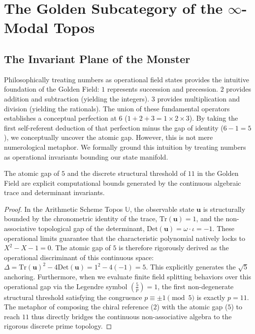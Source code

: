 \section{The Golden Subcategory of the \texorpdfstring{$\infty$}{\textinfty}-Modal Topos}

\subsection{The Invariant Plane of the Monster}\label{sec:invariant-plane}

Philosophically treating numbers as operational field states provides the intuitive foundation of the Golden Field: $1$ represents succession and precession. $2$ provides addition and subtraction (yielding the integers). $3$ provides multiplication and division (yielding the rationals). The union of these fundamental operators establishes a conceptual perfection at $6$ ($1+2+3 = 1 \times 2 \times 3$). By taking the first self-referent deduction of that perfection minus the gap of identity ($6 - 1 = 5$), we conceptually uncover the atomic gap. However, this is not mere numerological metaphor. We formally ground this intuition by treating numbers as operational invariants bounding our state manifold.

\begin{theorem}
The atomic gap of $5$ and the discrete structural threshold of $11$ in the Golden Field are explicit computational bounds generated by the continuous algebraic trace and determinant invariants.
\end{theorem}

\begin{proof}
In the Arithmetic Scheme Topos $\mathbb{U}$, the observable state $\mathbf{u}$ is structurally bounded by the chronometric identity of the trace, $\mathrm{Tr}(\mathbf{u}) = 1$, and the non-associative topological gap of the determinant, $\mathrm{Det}(\mathbf{u}) = \omega \cdot \iota = -1$. These operational limits guarantee that the characteristic polynomial natively locks to $X^2 - X - 1 = 0$. The atomic gap of $5$ is therefore rigorously derived as the operational discriminant of this continuous space: $\Delta = \mathrm{Tr}(\mathbf{u})^2 - 4\mathrm{Det}(\mathbf{u}) = 1^2 - 4(-1) = 5$. This explicitly generates the $\sqrt{5}$ anchoring. Furthermore, when we evaluate finite field splitting behaviors over this operational gap via the Legendre symbol $\left(\frac{5}{p}\right) = 1$, the first non-degenerate structural threshold satisfying the congruence $p \equiv \pm 1 \pmod 5$ is exactly $p = 11$. The metaphor of composing the chiral reference ($2$) with the atomic gap ($5$) to reach $11$ thus directly bridges the continuous non-associative algebra to the rigorous discrete prime topology. \qedhere
\end{proof}

